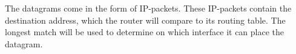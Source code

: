 The datagrams come in the form of IP-packets. These IP-packets contain the destination address, which the router will compare to its routing table. The longest match will be used to determine on which interface it can place the datagram.